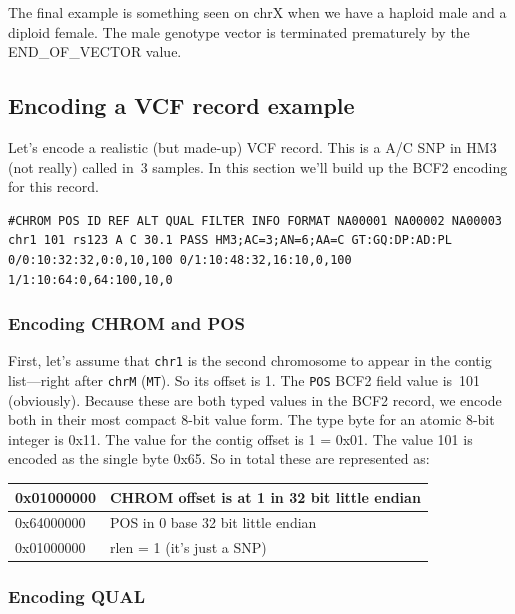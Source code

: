 \documentclass[8pt]{article}
\begin{document}
\vspace{0.3cm}
The final example is something seen on chrX when we have a haploid male and a diploid female.
The male genotype vector is terminated prematurely by the END\_OF\_VECTOR value.
\vspace{0.3cm}


\subsection{Encoding a VCF record example}

Let's encode a realistic (but made-up) VCF record.
This is a A/C SNP in HM3 (not really) called in~3 samples.
In this section we'll build up the BCF2 encoding for this record.
\scriptsize
\begin{verbatim}
#CHROM POS ID REF ALT QUAL FILTER INFO FORMAT NA00001 NA00002 NA00003
chr1 101 rs123 A C 30.1 PASS HM3;AC=3;AN=6;AA=C GT:GQ:DP:AD:PL 0/0:10:32:32,0:0,10,100 0/1:10:48:32,16:10,0,100 1/1:10:64:0,64:100,10,0
\end{verbatim}
\normalsize

\subsubsection{Encoding CHROM and POS}

First, let's assume that {\tt chr1} is the second chromosome to appear in the contig list---right after {\tt chrM} ({\tt MT}).
So its offset is 1.
The {\tt POS} BCF2 field value is~101 (obviously).
Because these are both typed values in the BCF2 record, we encode both in their most compact 8-bit value form.
The type byte for an atomic 8-bit integer is 0x11.
The value for the contig offset is 1 = 0x01.
The value 101 is encoded as the single byte 0x65.
So in total these are represented as:

\vspace{0.3cm}
\begin{tabular}{|l | l|} \hline
0x01000000 & CHROM offset is at 1 in 32 bit little endian \\ \hline
0x64000000 & POS in 0 base 32 bit little endian \\ \hline
0x01000000 & rlen = 1 (it's just a SNP) \\ \hline
\end{tabular}

\subsubsection{Encoding QUAL}
\end{document}
